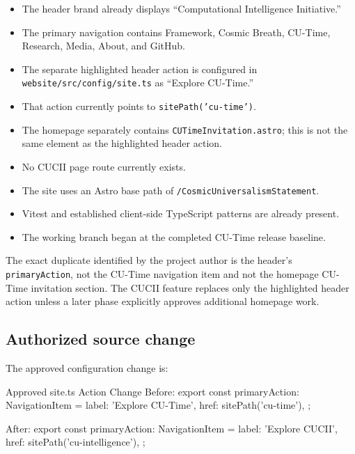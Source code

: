 \documentclass[11pt,letterpaper]{article}
\newcommand{\filepath}[1]{\texttt{#1}}
\begin{document}
\begin{itemize}
    \item The header brand already displays ``Computational Intelligence Initiative.''
    \item The primary navigation contains Framework, Cosmic Breath, CU-Time, Research,
          Media, About, and GitHub.
    \item The separate highlighted header action is configured in
          \filepath{website/src/config/site.ts} as ``Explore CU-Time.''
    \item That action currently points to \filepath{sitePath('cu-time')}.
    \item The homepage separately contains \filepath{CUTimeInvitation.astro}; this is not
          the same element as the highlighted header action.
    \item No CUCII page route currently exists.
    \item The site uses an Astro base path of
          \texttt{/CosmicUniversalismStatement}.
    \item Vitest and established client-side TypeScript patterns are already present.
    \item The working branch began at the completed CU-Time release baseline.
\end{itemize}

\begin{successbox}
The exact duplicate identified by the project author is the header's
\texttt{primaryAction}, not the CU-Time navigation item and not the homepage
CU-Time invitation section. The CUCII feature replaces only the highlighted
header action unless a later phase explicitly approves additional homepage work.
\end{successbox}

\subsection{Authorized source change}

The approved configuration change is:

\begin{codebox}{Approved site.ts Action Change}
Before:
export const primaryAction: NavigationItem = {
  label: 'Explore CU-Time',
  href: sitePath('cu-time'),
};

After:
export const primaryAction: NavigationItem = {
  label: 'Explore CUCII',
  href: sitePath('cu-intelligence'),
};
\end{codebox}
\end{document}
